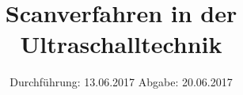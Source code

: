 

\subject{US2}
\title{Scanverfahren in der Ultraschalltechnik}
\date{
\centering
  Durchführung: 13.06.2017
  \hspace{3em}
  Abgabe: 20.06.2017
}



\maketitle
\thispagestyle{empty}
\tableofcontents
\newpage



%




\printbibliography


